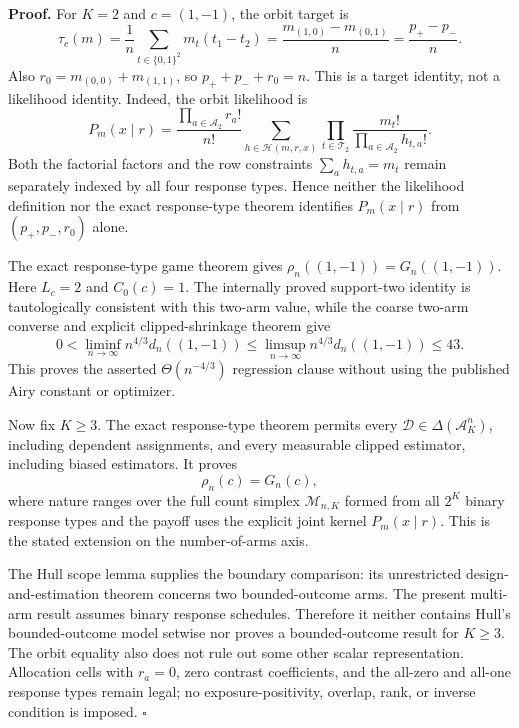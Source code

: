 \textbf{Proof.}
For \(K=2\) and \(c=(1,-1)\), the orbit target is
\[
 \tau_c(m)=\frac1n\sum_{t\in\{0,1\}^2}m_t(t_1-t_2)
 =\frac{m_{(1,0)}-m_{(0,1)}}n
 =\frac{p_+-p_-}{n}.
\]
Also \(r_0=m_{(0,0)}+m_{(1,1)}\), so \(p_++p_-+r_0=n\). This is a target identity, not a likelihood identity. Indeed, the orbit likelihood is
\[
 P_m(x\mid r)=\frac{\prod_{a\in\mathcal A_2}r_a!}{n!}
 \sum_{h\in\mathcal H(m,r,x)}
 \prod_{t\in\mathcal T_2}\frac{m_t!}{\prod_{a\in\mathcal A_2}h_{t,a}!}.
\]
Both the factorial factors and the row constraints \(\sum_a h_{t,a}=m_t\) remain separately indexed by all four response types. Hence neither the likelihood definition nor the exact response-type theorem identifies \(P_m(x\mid r)\) from \((p_+,p_-,r_0)\) alone.

The exact response-type game theorem gives \(\rho_n((1,-1))=G_n((1,-1))\). Here \(L_c=2\) and \(C_0(c)=1\). The internally proved support-two identity is tautologically consistent with this two-arm value, while the coarse two-arm converse and explicit clipped-shrinkage theorem give
\[
 0<\liminf_{n\to\infty}n^{4/3}d_n((1,-1))
 \leq\limsup_{n\to\infty}n^{4/3}d_n((1,-1))\leq43.
\]
This proves the asserted \(\Theta(n^{-4/3})\) regression clause without using the published Airy constant or optimizer.

Now fix \(K\geq3\). The exact response-type theorem permits every \(\mathcal D\in\Delta(\mathcal A_K^n)\), including dependent assignments, and every measurable clipped estimator, including biased estimators. It proves
\[
 \rho_n(c)=G_n(c),
\]
where nature ranges over the full count simplex \(\mathcal M_{n,K}\) formed from all \(2^K\) binary response types and the payoff uses the explicit joint kernel \(P_m(x\mid r)\). This is the stated extension on the number-of-arms axis.

The Hull scope lemma supplies the boundary comparison: its unrestricted design-and-estimation theorem concerns two bounded-outcome arms. The present multi-arm result assumes binary response schedules. Therefore it neither contains Hull's bounded-outcome model setwise nor proves a bounded-outcome result for \(K\geq3\). The orbit equality also does not rule out some other scalar representation. Allocation cells with \(r_a=0\), zero contrast coefficients, and the all-zero and all-one response types remain legal; no exposure-positivity, overlap, rank, or inverse condition is imposed. \(\square\)